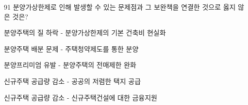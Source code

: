 \begin{question}{91}
분양가상한제로 인해 발생할 수 있는 문제점과 그 보완책을 연결한 것으로 옳지 않은 것은?
\begin{choices}
  \item 분양주택의 질 하락 - 분양가상한제의 기본 건축비 현실화
  \item 분양주택 배분 문제 - 주택청약제도를 통한 분양
  \item 분양프리미엄 유발 - 분양주택의 전매제한 완화
  \item 신규주택 공급량 감소 - 공공의 저렴한 택지 공급
  \item 신규주택 공급량 감소 - 신규주택건설에 대한 금융지원
\end{choices}
\end{question}
